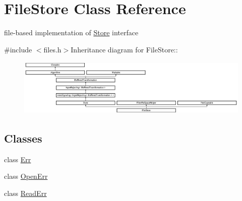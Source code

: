 \hypertarget{class_file_store}{
\section{FileStore Class Reference}
\label{class_file_store}
}


file-\/based implementation of \hyperlink{class_store}{Store} interface  


{\ttfamily \#include $<$files.h$>$}Inheritance diagram for FileStore::\begin{figure}[H]
\begin{center}
\leavevmode
\includegraphics[height=2.73743cm]{class_file_store}
\end{center}
\end{figure}
\subsection*{Classes}
\begin{DoxyCompactItemize}
\item 
class \hyperlink{class_file_store_1_1_err}{Err}
\item 
class \hyperlink{class_file_store_1_1_open_err}{OpenErr}
\item 
class \hyperlink{class_file_store_1_1_read_err}{ReadErr}
\end{DoxyCompactItemize}
